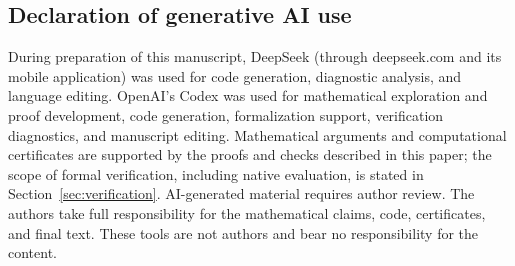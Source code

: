 \documentclass[11pt]{article}
\theoremstyle{remark}
\theoremstyle{definition}
\begin{document}







\appendix

\begin{samepage}
\section*{Declaration of generative AI use}
During preparation of this manuscript, DeepSeek (through deepseek.com and
its mobile application) was used for code generation, diagnostic analysis,
and language editing. OpenAI's Codex was used for mathematical exploration
and proof development, code generation, formalization support, verification
diagnostics, and manuscript editing. Mathematical arguments and computational
certificates are supported by the proofs and checks described in this paper;
the scope of formal verification, including native evaluation, is stated in
Section~\ref{sec:verification}. AI-generated material requires author review.
The authors take full responsibility for the mathematical claims, code,
certificates, and final text. These tools are not authors and bear no
responsibility for the content.
\end{samepage}
\end{document}
